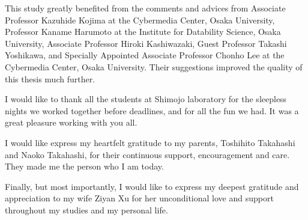 This study greatly benefited from the comments and advices from Associate
Professor Kazuhide Kojima at the Cybermedia Center, Osaka University,
Professor Kaname Harumoto at the Institute for Datability Science, Osaka
University, Associate Professor Hiroki Kashiwazaki, Guest Professor Takashi
Yoshikawa, and Specially Appointed Associate Professor Chonho Lee at the
Cybermedia Center, Osaka University. Their suggestions improved the quality of
this thesis much further.

I would like to thank all the students at Shimojo laboratory for the sleepless
nights we worked together before deadlines, and for all the fun we had. It was
a great pleasure working with you all.

I would like express my heartfelt gratitude to my parents, Toshihito Takahashi
and Naoko Takahashi, for their continuous support, encouragement and care. They
made me the person who I am today.

Finally, but most importantly, I would like to express my deepest gratitude
and appreciation to my wife Ziyan Xu for her unconditional love and support
throughout my studies and my personal life.
